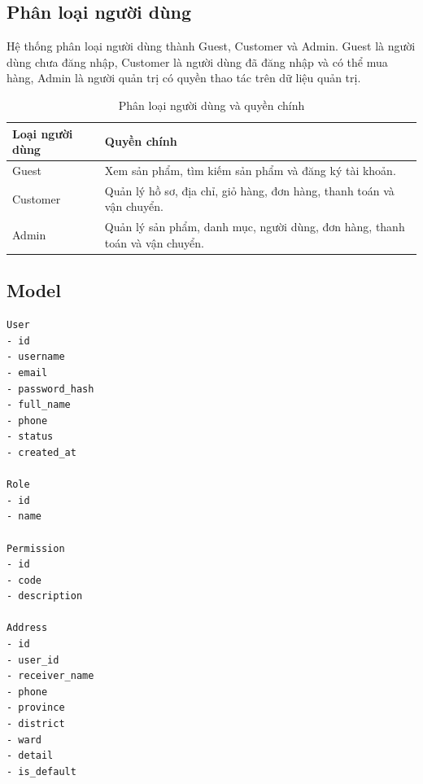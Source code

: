 \documentclass[../main.tex]{subfiles}
\begin{document}
\subsection{Phân loại người dùng}
\label{subsection:2.4.1}

Hệ thống phân loại người dùng thành Guest, Customer và Admin. Guest là người dùng chưa đăng nhập, Customer là người dùng đã đăng nhập và có thể mua hàng, Admin là người quản trị có quyền thao tác trên dữ liệu quản trị.

\begin{table}[H]
    \centering
    \caption{Phân loại người dùng và quyền chính}
    \label{tab:chapter2-user-types}
    \begin{tabular}{|p{}|p{}|}
        \hline
        \rowcolor{primary!35}
        \textbf{Loại người dùng} & \textbf{Quyền chính} \\
        \hline
        Guest & Xem sản phẩm, tìm kiếm sản phẩm và đăng ký tài khoản. \\
        \hline
        Customer & Quản lý hồ sơ, địa chỉ, giỏ hàng, đơn hàng, thanh toán và vận chuyển. \\
        \hline
        Admin & Quản lý sản phẩm, danh mục, người dùng, đơn hàng, thanh toán và vận chuyển. \\
        \hline
    \end{tabular}
\end{table}

\subsection{Model}
\label{subsection:2.4.2}

\begin{lstlisting}[caption={Model tổng quát của User Service}, label={lst:chapter2-user-model}]
User
- id
- username
- email
- password_hash
- full_name
- phone
- status
- created_at

Role
- id
- name

Permission
- id
- code
- description

Address
- id
- user_id
- receiver_name
- phone
- province
- district
- ward
- detail
- is_default
\end{lstlisting}
\end{document}
